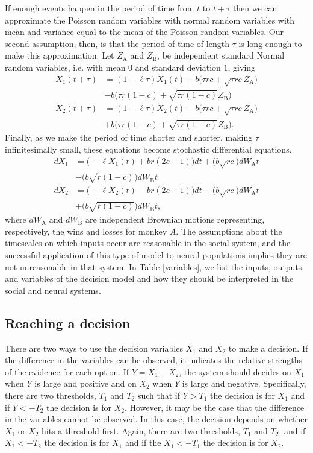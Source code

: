\documentclass{pnastwo}
\begin{document}
\begin{article}
If enough events happen in the period of time from $t$ to $t+\tau$ then we can approximate the Poisson random variables with normal random variables with mean and variance equal to the mean of the Poisson random variables.  Our second assumption, then, is that the period of time of length $\tau$ is long enough to make this approximation. Let $Z_\text{A}$ and $Z_\text{B}$, be independent standard Normal random variables, i.e. with mean $0$ and standard deviation $1$, giving
\begin{align*}
X_1(t+\tau)&=(1-\ell\tau)X_1(t)+b\bigg(\tau rc+\sqrt{\tau rc}Z_{\text{A}}\bigg)\\&-b\bigg(\tau r(1-c)+\sqrt{\tau r(1-c)}Z_{\text{B}}\bigg)
\\X_2(t+\tau)&=(1-\ell\tau)X_2(t)-b\bigg(\tau rc+\sqrt{\tau rc}Z_{\text{A}}\bigg)\\&+b\bigg(\tau r(1-c)+\sqrt{\tau r(1-c)}Z_{\text{B}}\bigg).
\end{align*}
Finally, as we make the period of time shorter and shorter, making $\tau$ infinitesimally small, these equations become stochastic differential equations,
\begin{equation*}
\begin{array}{ll}
dX_1&=\bigg(-\ell X_1(t)+br(2c-1)\bigg)dt+\bigg(b\sqrt{rc}\bigg)dW_\text{A}t\\&-\bigg(b\sqrt{r(1-c)}\bigg)dW_\text{B}t
\\dX_2&=\bigg(-\ell X_2(t)-br(2c-1)\bigg)dt-\bigg(b\sqrt{rc}\bigg)dW_\text{A}t\\&+\bigg(b\sqrt{r(1-c)}\bigg)dW_\text{B}t,
\end{array}
\end{equation*}
where $dW_{\text{A}}$ and $dW_{\text{B}}$ are independent Brownian motions representing, respectively, the wins and losses for monkey $A$.  The assumptions about the timescales on which inputs occur are reasonable in the social system, and the successful application of this type of model to neural populations implies they are not unreasonable in that system.  In Table \ref{variables}, we list the inputs, outputs, and variables of the decision model and how they should be interpreted in the social and neural systems.


\subsection{Reaching a decision}
There are two ways to use the decision variables $X_1$ and $X_2$ to make a decision.  If the difference in the variables can be observed, it indicates the relative strengths of the evidence for each option. If $Y=X_1-X_2$, the system should decides on $X_1$ when $Y$ is large and positive and on $X_2$ when $Y$ is large and negative.  Specifically, there are two thresholds, $T_1$ and $T_2$ such that if $Y>T_1$ the decision is for $X_1$ and if $Y<-T_2$ the decision is for $X_2$.  However, it may be the case that the difference in the variables cannot be observed.  In this case, the decision depends on whether $X_1$ or $X_2$ hits a threshold first.  Again, there are two thresholds, $T_1$ and $T_2$, and if $X_2<-T_2$ the decision is for $X_1$ and if the $X_1<-T_1$ the decision is for $X_2$. 


\end{article}
\end{document}

